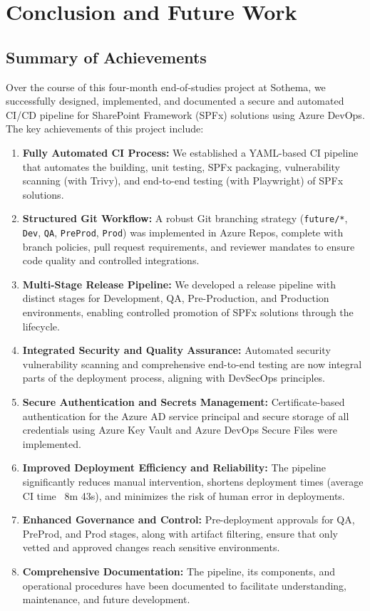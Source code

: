 \chapter*{Conclusion and Future Work}
\label{conclusion}

\section{Summary of Achievements}
\label{sec:SummaryAchievements}

Over the course of this four-month end-of-studies project at Sothema, we successfully designed, implemented, and documented a secure and automated CI/CD pipeline for SharePoint Framework (SPFx) solutions using Azure DevOps. The key achievements of this project include:

\begin{enumerate}
    \item \textbf{Fully Automated CI Process:} We established a YAML-based CI pipeline that automates the building, unit testing, SPFx packaging, vulnerability scanning (with Trivy), and end-to-end testing (with Playwright) of SPFx solutions.
    \item \textbf{Structured Git Workflow:} A robust Git branching strategy (\texttt{future/*}, \texttt{Dev}, \texttt{QA}, \texttt{PreProd}, \texttt{Prod}) was implemented in Azure Repos, complete with branch policies, pull request requirements, and reviewer mandates to ensure code quality and controlled integrations.
    \item \textbf{Multi-Stage Release Pipeline:} We developed a release pipeline with distinct stages for Development, QA, Pre-Production, and Production environments, enabling controlled promotion of SPFx solutions through the lifecycle.
    \item \textbf{Integrated Security and Quality Assurance:} Automated security vulnerability scanning and comprehensive end-to-end testing are now integral parts of the deployment process, aligning with DevSecOps principles.
    \item \textbf{Secure Authentication and Secrets Management:} Certificate-based authentication for the Azure AD service principal and secure storage of all credentials using Azure Key Vault and Azure DevOps Secure Files were implemented.
    \item \textbf{Improved Deployment Efficiency and Reliability:} The pipeline significantly reduces manual intervention, shortens deployment times (average CI time ~8m 43s), and minimizes the risk of human error in deployments.
    \item \textbf{Enhanced Governance and Control:} Pre-deployment approvals for QA, PreProd, and Prod stages, along with artifact filtering, ensure that only vetted and approved changes reach sensitive environments.
    \item \textbf{Comprehensive Documentation:} The pipeline, its components, and operational procedures have been documented to facilitate understanding, maintenance, and future development.
\end{enumerate}

